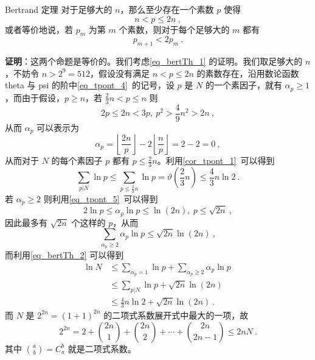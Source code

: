 

\begin{theorem}{Bertrand 定理}
对于足够大的 $n$，那么至少存在一个素数 $p$ 使得
\begin{equation}\label{eq_bertTh_1}
n < p \le 2n ~,
\end{equation}
或者等价地说，若 $p_m$ 为第 $m$ 个素数，则对于每个足够大的 $m$ 都有
\begin{equation}
p_{m+1} < 2 p_m ~.
\end{equation}

\end{theorem}

\textbf{证明}：这两个命题是等价的。我们考虑\autoref{eq_bertTh_1} 的证明。我们取足够大的 $n$，不妨令 $n > 2^9 = 512$，假设没有满足 $n < p \le 2n$ 的素数存在，沿用数论函数 theta 与 psi 的阶中\autoref{eq_tpont_4}~的记号，设 $p$ 是 $N$ 的一个素因子，就有 $\alpha_p \ge 1$，而由于假设，$p \ge n$，若 $\frac 23 n < p \le n$ 则
\begin{equation}
2p \le 2n < 3p, ~ p^2  > \frac 49 n^2 > 2n~,
\end{equation}
从而 $\alpha_p$ 可以表示为
\begin{equation}
\alpha_p = \left\lfloor \frac{2n}p \right\rfloor - 2 \left \lfloor \frac np \right \rfloor = 2 - 2 = 0 ~,
\end{equation}
从而对于 $N$ 的每个素因子 $p$ 都有 $p \le \frac23 n$。利用\autoref{cor_tpont_1}~可以得到
\begin{equation}\label{eq_bertTh_2}
\sum_{p | N} \ln p \le \sum_{p\le \frac 23 n} \ln p = \vartheta(\frac 23 n) \le \frac 43 n \ln 2 ~.
\end{equation}
若 $\alpha_p \ge 2$ 则利用\autoref{eq_tpont_5}~可以得到
\begin{equation}
2 \ln p \le \alpha_p \ln p \le \ln (2n), ~ p \le \sqrt{2n } ~,
\end{equation}
因此最多有 $\sqrt{2n}$ 个这样的 $p$，从而
\begin{equation}
\sum_{\alpha_p \ge 2} \alpha_p \ln p \le \sqrt{2n} \ln(2n) ~,
\end{equation}
而利用\autoref{eq_bertTh_2} 可以得到
\begin{equation}
\begin{aligned}
\ln N &\le \sum_{\alpha_p = 1} \ln p + \sum_{\alpha_p \ge 2} \alpha_p \ln p ~\\
& \le \sum_{p | N} \ln p + \sqrt{2n} \ln(2n) ~\\
& \le \frac43 n \ln 2 + \sqrt{2n} \ln(2n) ~.
\end{aligned}
\end{equation}
而 $N$ 是 $2^{2n} = (1+1)^{2n}$ 的二项式系数展开式中最大的一项，故
\begin{equation}
2^{2n} = 2 + \binom{2n}{1} + \binom{2n}{2} + \cdots + \binom{2n}{2n-1} \le 2nN ~.
\end{equation}
其中 $\binom{a}{b}  = C^b_a$ 就是二项式系数。


